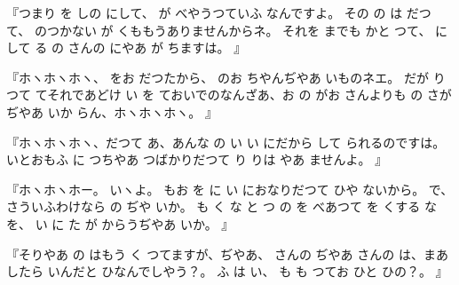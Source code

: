 『つまり
を
しの
にして、
が
べやうつていふ
なんですよ。
その
の
は
だつて、
のつかない
が
くももうありませんからネ。
それを
までも
かと
つて、
にして
る
の
さんの
にやあ
が
ちますは。
』

『ホヽホヽホヽ、
をお
だつたから、
のお
ちやんぢやあ
いものネエ。
だが
り
つて
てそれであどけ
い
を
ておいでのなんざあ、お
の
がお
さんよりも
の
さが
ぢやあ
いか
らん、ホヽホヽホヽ。
』

『ホヽホヽホヽ、だつて
あ、あんな
の
い
い
にだから
して
られるのですは。
いとおもふ
に
つちやあ
つばかりだつて
り
りは
やあ
ませんよ。
』

『ホヽホヽホー。
いヽよ。
もお
を
に
い
におなりだつて
ひや
ないから。
で、さういふわけなら
の
ぢや
いか。
も
く
な
と
つ
の
を
べあつて
を
くする
な
を、
い
に
た
が
からうぢやあ
いか。
』

『そりやあ
の
はもう
く
つてますが、ぢやあ、
さんの
ぢやあ
さんの
は、まあ
したら
いんだと
ひなんでしやう？。
ふ
は
い、
も
も
つてお
ひと
ひの？。
』

